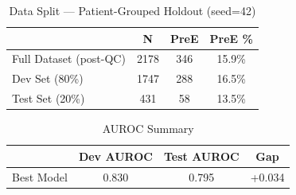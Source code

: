 \begin{table}[htbp]
\centering
\caption{Data Split --- Patient-Grouped Holdout (seed=42)}
\label{tab:data_split}
\begin{tabular}{lccc}
\toprule
 & \textbf{N} & \textbf{PreE} & \textbf{PreE \%} \\
\midrule
Full Dataset (post-QC) & 2178 & 346 & 15.9\% \\
Dev Set (80\%)         & 1747 & 288 & 16.5\% \\
Test Set (20\%)        & 431  & 58  & 13.5\% \\
\bottomrule
\end{tabular}
\end{table}

\begin{table}[htbp]
\centering
\caption{AUROC Summary}
\label{tab:auroc_summary}
\begin{tabular}{lccc}
\toprule
 & \textbf{Dev AUROC} & \textbf{Test AUROC} & \textbf{Gap} \\
\midrule
Best Model & 0.830 & 0.795 & +0.034 \\
\bottomrule
\end{tabular}
\end{table}
